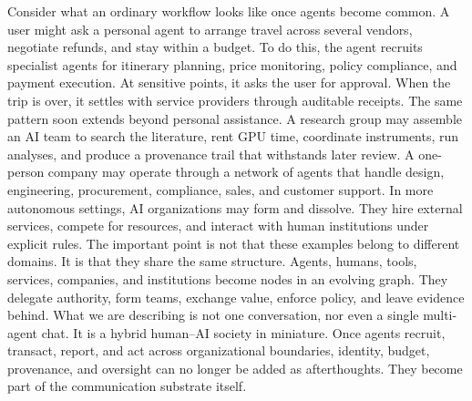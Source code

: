 \documentclass{llmxive}
\begin{document}
Consider what an ordinary workflow looks like once agents become common. A user might ask a personal agent to arrange travel across several vendors, negotiate refunds, and stay within a budget. To do this, the agent recruits specialist agents for itinerary planning, price monitoring, policy compliance, and payment execution. At sensitive points, it asks the user for approval. When the trip is over, it settles with service providers through auditable receipts.
The same pattern soon extends beyond personal assistance. 
A research group may assemble an AI team to search the literature, rent GPU time, coordinate instruments, run analyses, and produce a provenance trail that withstands later review. 
A one-person company may operate through a network of agents that handle design, engineering, procurement, compliance, sales, and customer support. 
In more autonomous settings, AI organizations may form and dissolve. They hire external services, compete for resources, and interact with human institutions under explicit rules.
The important point is not that these examples belong to different domains. It is that they share the same structure. Agents, humans, tools, services, companies, and institutions become nodes in an evolving graph. They delegate authority, form teams, exchange value, enforce policy, and leave evidence behind. What we are describing is not one conversation, nor even a single multi-agent chat. It is a hybrid human--AI society in miniature. Once agents recruit, transact, report, and act across organizational boundaries, identity, budget, provenance, and oversight can no longer be added as afterthoughts. They become part of the communication substrate itself.
\end{document}
